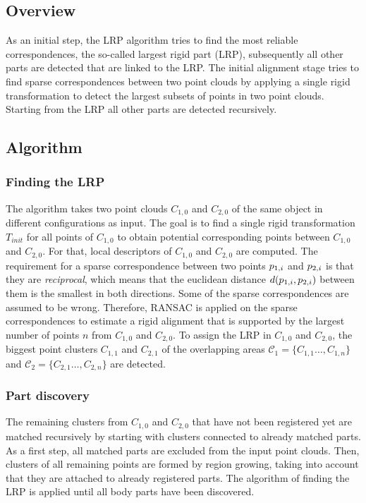 \subsection{Overview}
As an initial step, the LRP algorithm tries to find the most reliable correspondences, the so-called largest rigid part (LRP), subsequently all other parts are detected that are linked to the LRP. The initial alignment stage tries to find sparse correspondences between two point clouds by applying a single rigid transformation to detect the largest subsets of points in two point clouds. Starting from the LRP all other parts are detected recursively.
\subsection{Algorithm} 

\subsubsection{Finding the LRP}

The algorithm takes two point clouds $C_{1,0}$ and $C_{2,0}$ of the same object in different configurations as input.
The goal is to find a single rigid transformation $T_{init}$ for all points of $C_{1,0}$ to obtain potential corresponding points between $C_{1,0}$ and $C_{2,0}$. For that, local descriptors of $C_{1,0}$ and $C_{2,0}$ are computed. The requirement for a sparse correspondence between two points $\boldmath{p}_{1,i}$ and $\boldmath{p}_{2,i}$  is that they are \textit{reciprocal}, which means that the euclidean distance $d(\boldmath{p}_{1,i}, \boldmath{p}_{2,i})$ between them is the smallest in both directions. Some of the sparse correspondences are assumed to be wrong. Therefore, RANSAC is applied on the sparse correspondences  to estimate a rigid alignment that is supported by the largest number of points $n$ from $C_{1,0}$ and $C_{2,0}$. To assign the LRP in $C_{1,0}$ and $C_{2,0}$, the biggest point clusters $C_{1,1}$ and $C_{2,1}$ of the overlapping areas $\mathcal{C}_1 = \{C_{1,1}\ldots,C_{1,n}\}$ and  $\mathcal{C}_2 = \{C_{2,1}\ldots,C_{2,n}\}$ are detected. 


\subsubsection{Part discovery}

The remaining clusters from $C_{1,0}$ and $C_{2,0}$ that have not been registered yet are matched recursively by starting with clusters connected to already matched parts. As a first step, all matched parts are excluded from the input point clouds. Then, clusters of all remaining points are formed by region growing, taking into account that they are attached to already registered parts. The algorithm of finding the LRP is applied until all body parts have been discovered.